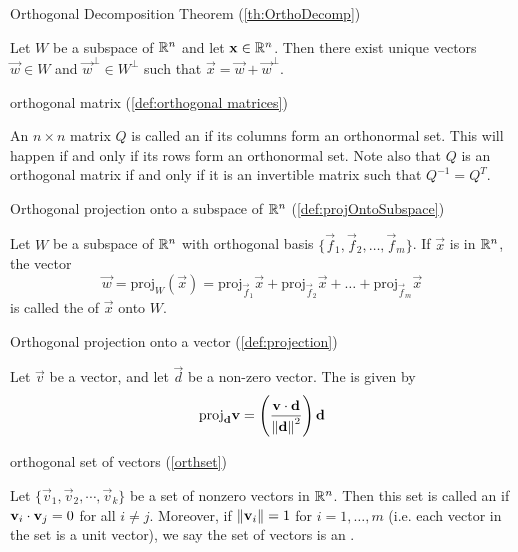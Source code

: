 \documentclass{ximera}
\begin{document}
Orthogonal Decomposition Theorem (\ref{th:OrthoDecomp})
\begin{expandable}{}{}
    Let $W$ be a subspace of $\mathbb{R}^n$ and let $\mathbf{x} \in \mathbb{R}^n$.  Then there exist unique vectors $\vec{w} \in W$ and $\vec{w}^\perp \in W^\perp$ such that $\vec{x} = \vec{w} + \vec{w}^\perp$.
\end{expandable}

orthogonal matrix (\ref{def:orthogonal matrices})
\begin{expandable}{}{}
    An $n \times n$ matrix $Q$ is called an  if its columns form an orthonormal set.  This will happen if and only if its rows form an orthonormal set.  Note also that $Q$ is an orthogonal matrix if and only if it is an invertible matrix such that $Q^{-1}=Q^{T}$.
\end{expandable}

Orthogonal projection onto a subspace of $\mathbb{R}^n$ (\ref{def:projOntoSubspace})
\begin{expandable}{}{}
    Let $W$ be a subspace of $\mathbb{R}^n$ with orthogonal basis $\{\vec{f}_{1}, \vec{f}_{2}, \dots, \vec{f}_{m}\}$. If $\vec{x}$ is in $\mathbb{R}^n$, the vector
\begin{equation}
\vec{w}=\mbox{proj}_W(\vec{x}) = \mbox{proj}_{\vec{f}_1}\vec{x} + \mbox{proj}_{\vec{f}_2}\vec{x} + \dots + \mbox{proj}_{\vec{f}_m}\vec{x}
\end{equation}
is called the  of $\vec{x}$ onto $W$. 
\end{expandable}

Orthogonal projection onto a vector (\ref{def:projection})
\begin{expandable}{}{}
    Let $\vec{v}$ be a vector, and let $\vec{d}$ be a non-zero vector.  The  is given by 
$$\mbox{proj}_{\mathbf{d}}\mathbf{v}=\left(\frac{\mathbf{v}\cdot\mathbf{d}}{\left\lVert\mathbf{d}\right\rVert^2}\right)\mathbf{d}$$
\end{expandable}

orthogonal set of vectors (\ref{orthset})
\begin{expandable}{}{}
    Let $\{ \vec{v}_1, \vec{v}_2, \cdots, \vec{v}_k \}$ be a set of nonzero
vectors in $\mathbb{R}^n$. Then this set is called an
 if 
$\mathbf{v}_i \cdot \mathbf{v}_j = 0$ for all $i \neq j$.
Moreover, if $\left\lVert\mathbf{v}_i\right\rVert=1$ for $i=1,\ldots,m$ (i.e. each vector in the set is a unit vector), we say the set of vectors is an .
\end{expandable}
\end{document}
